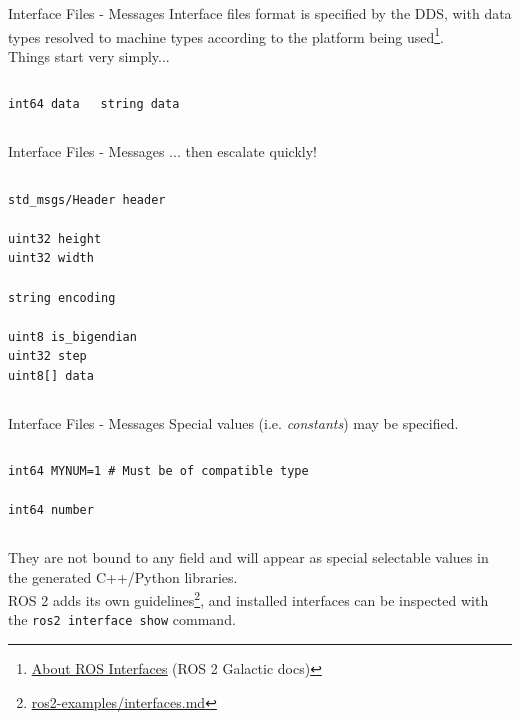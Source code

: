 \begin{frame}[fragile]{Interface Files - Messages}
Interface files format is specified by the DDS, with data types resolved to machine types according to the platform being used\footnote{\href{https://docs.ros.org/en/galactic/Concepts/About-ROS-Interfaces.html}{\color{blue}\underline{About ROS Interfaces}} (ROS 2 Galactic docs)}.\\
Things start very simply...

\begin{columns}
\begin{lstlisting}[language=ros2msg, caption=Definition of the \texttt{std\_msgs/msg/Int64} message]
int64 data
\end{lstlisting}

\begin{lstlisting}[language=ros2msg, caption=Definition of the \texttt{std\_msgs/msg/String} message]
string data
\end{lstlisting}
\end{columns}

\end{frame}
\begin{frame}[fragile]{Interface Files - Messages}
... then escalate quickly!

\begin{columns}
\begin{lstlisting}[language=ros2msg, caption=Definition of the \texttt{sensor\_msgs/msg/Image} composite message]
std_msgs/Header header

uint32 height
uint32 width

string encoding

uint8 is_bigendian
uint32 step
uint8[] data
\end{lstlisting}
\end{columns}

\end{frame}
\begin{frame}[fragile]{Interface Files - Messages}
Special values (i.e. \emph{constants}) may be specified.

\begin{columns}
\begin{lstlisting}[language=ros2msg, caption=Definition of an example message with a constant value]
int64 MYNUM=1 # Must be of compatible type

int64 number
\end{lstlisting}
\end{columns}

They are not bound to any field and will appear as special selectable values in the generated C++/Python libraries.\\
ROS 2 adds its own guidelines\footnote{\href{https://github.com/IntelligentSystemsLabUTV/ros2-examples/blob/galactic/interfaces.md}{\color{blue}\underline{ros2-examples/interfaces.md}}}, and installed interfaces can be inspected with the \texttt{ros2 interface show} command.
\end{frame}

